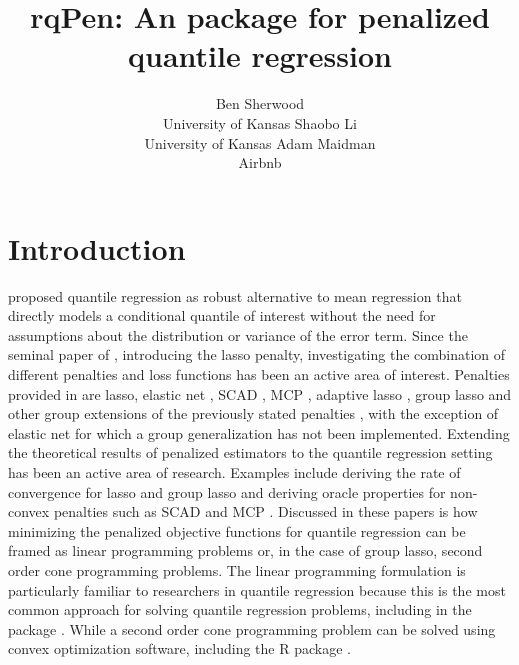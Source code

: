 \documentclass[article]{rqPenVignette}%
\author{Ben Sherwood\\University of Kansas
   \And Shaobo Li\\University of Kansas 
   \And Adam Maidman \\ Airbnb}
\title{rqPen: An \proglang{R} package for penalized quantile regression}
\begin{document}


\section{Introduction} \label{sec:intro}


\cite{origQR} proposed quantile regression as robust alternative to mean regression that 
directly models a conditional quantile of interest without the need for assumptions about the 
distribution or variance of the error term. Since the seminal paper of \citep{lasso}, introducing the lasso penalty, investigating the 
combination of different penalties and loss functions has been an active area of interest. Penalties provided in  are lasso, 
elastic net \citep{zou05}, SCAD \citep{fanLi}, MCP \citep{mcp}, adaptive lasso \citep{adaptiveLasso}, group lasso \citep{yuan2007} and other group extensions of the previously stated penalties \citep{grSCAD, groupReview, penBiLevel}, with the exception of elastic net for which a group generalization has not been implemented. Extending the theoretical results of penalized estimators to the quantile regression setting has been an active area of research. Examples include deriving the rate of convergence for lasso \citep{qr_lasso} and group lasso \citep{qr_group_lasso} and deriving oracle properties for non-convex penalties such as SCAD and MCP \citep{lan_scad}. Discussed in these papers is how minimizing the penalized objective functions for quantile regression can be framed as linear programming problems or, in the case of group lasso, second order cone programming problems. The linear programming formulation is particularly familiar to researchers in quantile regression because this is the most common approach for solving quantile regression problems, including in the  package \citep{crq1,crq2}. While a second order cone programming problem can be solved using convex optimization software, including the R package  \citep{JSSv060i05}.
\end{document}
